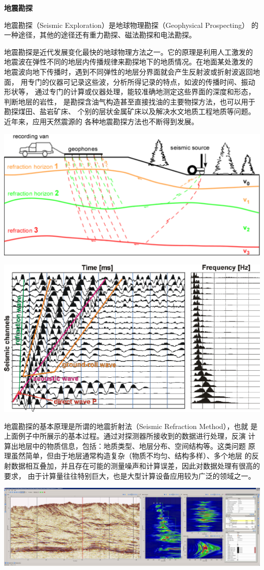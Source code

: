 \begin{shaded}
	{\bf 地震勘探}
	
	地震勘探（Seismic Exploration）是地球物理勘探（Geophysical Prospecting）
	的一种途径，其他的途径还有重力勘探、磁法勘探和电法勘探。
	
	地震勘探是近代发展变化最快的地球物理方法之一。它的原理是利用人工激发的
	地震波在弹性不同的地层内传播规律来勘探地下的地质情况。在地面某处激发的
	地震波向地下传播时，遇到不同弹性的地层分界面就会产生反射波或折射波返回地面，
	用专门的仪器可记录这些波，分析所得记录的特点，如波的传播时间、振动形状等，
	通过专门的计算或仪器处理，能较准确地测定这些界面的深度和形态，判断地层的岩性，
	是勘探含油气构造甚至直接找油的主要物探方法，也可以用于勘探煤田、盐岩矿床、
	个别的层状金属矿床以及解决水文地质工程地质等问题。近年来，应用天然震源的
	各种地震勘探方法也不断得到发展。
	
	\begin{center}
		\includegraphics[width=.6\textwidth]{./images/ch03/RS-reality.pdf}
		
		\includegraphics[width=.6\textwidth]{./images/ch03/RS-dataP-4.pdf}
	\end{center}
	
	地震勘探的基本原理是所谓的地震折射法（Seismic Refraction Method），也就
	是上面例子中所展示的基本过程。通过对探测器所接收到的数据进行处理，反演
	计算出地层中的物质信息，包括：地质类型、地层分布、空间结构等。这类问题
	原理虽然简单，但由于地层通常构造复杂（物质不均匀、结构多样）、多个地层
	的反射数据相互叠加，并且存在可能的测量噪声和计算误差，因此对数据处理有很高的要求，
	由于计算量往往特别巨大，也是大型计算设备应用较为广泛的领域之一。
	
	\begin{center}
		\includegraphics[width=.8\textwidth]{./images/ch03/RS-dataP-1.jpg}
		

\end{center}
\end{shaded}
